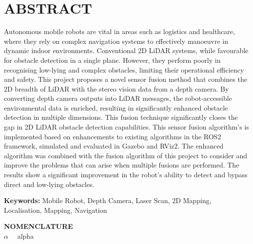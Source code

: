 \section*{ABSTRACT}
\vspace{0.5cm}
Autonomous mobile robots are vital in areas such as logistics and healthcare, where they rely on complex navigation systems to effectively manoeuvre in dynamic indoor environments. Conventional 2D LiDAR systems, while favourable for obstacle detection in a single plane. However, they perform poorly in recognising low-lying and complex obstacles, limiting their operational efficiency and safety.
This project proposes a novel sensor fusion method that combines the 2D breadth of LiDAR with the stereo vision data from a depth camera. By converting depth camera outputs into LiDAR messages, the robot-accessible environmental data is enriched, resulting in significantly enhanced obstacle detection in multiple dimensions. This fusion technique significantly closes the gap in 2D LiDAR obstacle detection capabilities.
This sensor fusion algorithm's is implemented based on enhancements to existing algorithms in the ROS2 framework, simulated and evaluated in Gazebo and RViz2. The enhanced algorithm was combined with the fusion algorithm of this project to consider and improve the problems that can arise when multiple fusions are performed.
The results show a significant improvement in the robot's ability to detect and bypass direct and low-lying obstacles.
\vspace{0.5cm}

\textbf{Keywords:} Mobile Robot, Depth Camera, Laser Scan, 2D Mapping, Localisation, Mapping, Navigation

\vspace{0.5cm}
\textbf{NOMENCLATURE}
\\
$\alpha \quad$ alpha